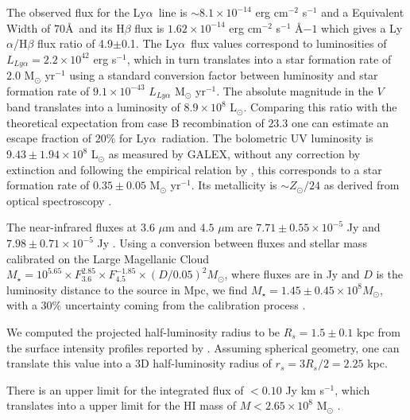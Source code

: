 \documentclass[a4,useAMS,usenatbib,usegraphicx]{mn2e}
\newcommand{\lya}{Ly$\alpha$}
\begin{document}
The observed flux for the \lya\ line is $\sim
8.1\times 10^{-14}$ erg cm$^{-2}$ s$^{-1}$ \citep{Thuan97}
and a Equivalent Width of $70$\AA\ and its H$\beta$ flux is 
$1.62\times 10^{-14}$ erg cm$^{-2}$ s$^{-1}$ \AA${-1}$
\citep{Izotov04} which gives a \lya/H$\beta$ flux ratio of
4.9$\pm$0.1.
The \lya\ flux values correspond to luminosities of
$L_{Ly\alpha}=2.2\times 10^{42}$ erg s$^{-1}$, which in turn
translates  into a star formation rate of $2.0$ M$_{\odot}$ yr$^{-1}$
using a standard conversion factor between luminosity and star
formation rate of $9.1\times 10^{-43}$ $L_{Ly\alpha}$ M$_{\odot}$ yr$^{-1}$. 
The absolute magnitude in the $V$ band translates into a luminosity of
$8.9\times 10^{8}$ L$_{\odot}$.
Comparing this ratio with the theoretical expectation from case B
recombination of $23.3$ \citep{Hummer1987} one can estimate an escape
fraction of $20$\% for \lya\ radiation.
The bolometric UV luminosity is $9.43\pm1.94 \times 10^{8}$
L$_{\odot}$ as measured by GALEX, without any correction by extinction
and following the empirical relation by \cite{Kennicutt98}, this
corresponds to a star formation rate of $0.35\pm 0.05$ M$_{\odot}$
yr$^{-1}$. Its metallicity is $\sim Z_{\odot}/24$ as derived from
optical spectroscopy \citep{Izotov04}. 



The near-infrared fluxes at $3.6$ $\mu$m and $4.5$ $\mu$m are
$7.71\pm0.55\times 10^{-5}$ Jy and $7.98\pm0.71\times 10^{-5}$ Jy
\citep{2008ApJ...678..804E}.
Using a conversion between fluxes and
stellar mass calibrated on the Large Magellanic Cloud $M_{\star} =
10^{5.65} \times F_{3.6}^{2.85} \times F_{4.5}^{-1.85} \times
(D/0.05)^2 M_{\odot}$, where fluxes are in Jy and $D$ is the luminosity
distance to the source in Mpc, we find $M_{\star} = 1.45\pm0.45\times 10^{8}
M_{\odot}$, with a $30\%$ uncertainty coming from the calibration
process \citep{2012AJ....143..139E}.  

We computed the projected half-luminosity radius to be $R_s=1.5\pm0.1$ kpc 
from the surface intensity profiles reported by \citep{2003A&A...410..481N}. 
Assuming spherical geometry, one can translate this value into a 3D
half-luminosity radius of $r_s=3R_s/2=2.25$ kpc.

There is an upper limit for the  
integrated flux of $<0.10$ Jy km s$^{-1}$, which translates into a
upper limit for the HI mass of $M<2.65\times 10^{8}$ M$_{\odot}$
\citep{pustilnikmartin07}.  
\end{document}
